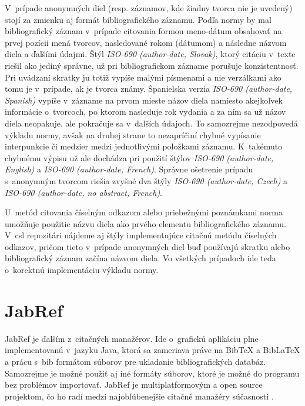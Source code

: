 \documentclass{fithesis3}
\begin{document}
	V~prípade anonymných diel (resp. záznamov, kde žiadny tvorca nie je uvedený) stojí za zmienku aj formát bibliografického záznamu. Podľa normy by mal bibliografický záznam v~prípade citovania formou meno-dátum obsahovať na prvej pozícii mená tvorcov, nasledované rokom (dátumom) a následne názvom diela a ďalšími údajmi. Štýl \textit{ISO-690 (author-date, Slovak)}, ktorý citáciu v~texte riešil ako jediný správne, už pri bibliografickom zázname porušuje konzistentnosť. Pri uvádzaní skratky  ju totiž vypíše malými písmenami a nie verzálkami ako tomu je v~prípade, ak je tvorca známy. Španielska verzia \textit{ISO-690 (author-date, Spanish)} vypíše v~zázname na prvom mieste názov diela namiesto akejkoľvek informácie o~tvorcoch, po ktorom nasleduje rok vydania a za ním sa už názov diela neopakuje, ale pokračuje sa v~ďalších údajoch. To samozrejme nezodpovedá výkladu normy, avšak na druhej strane to nezapríčiní chybné vypísanie interpunkcie či medzier medzi jednotlivými položkami záznamu. K~takémuto chybnému výpisu už ale dochádza pri použití štýlov \textit{ISO-690 (author-date, English)} a \textit{ISO-690 (author-date, French)}. Správne ošetrenie prípadu s~anonymným tvorcom riešia zvyšné dva štýly \textit{ISO-690 (author-date, Czech)} a \textit{ISO-690 (author-date, no abstract, French)}.
	
	U~metód citovania číselným odkazom alebo priebežnými poznámkami norma umožňuje použitie názvu diela ako prvého elementu bibliografického záznamu. V~csl repozitári nájdeme aj štýly implementujúce citačnú metódu číselných odkazov, pričom tieto v~prípade anonymných diel buď používajú skratku  alebo bibliografický záznam začína názvom diela. Vo všetkých prípadoch ide teda o~korektnú implementáciu výkladu normy.
	
	\section{JabRef}
	
	JabRef je ďalším z~citačných manažérov. Ide o~grafickú aplikáciu plne implementovanú v~jazyku Java, ktorá sa zameriava práve na BibTeX a BibLaTeX a prácu s~bib formátom súborov pre ukladanie bibliografických databáz. Samozrejme je možné použiť aj iné formáty súborov, ktoré je možné do programu bez problémov importovať. JabRef je multiplatformovým a open source projektom, čo ho radí medzi najobľúbenejšie citačné manažéry súčasnosti \cite{AlternativeToJabRef}.
	
	
\end{document}
